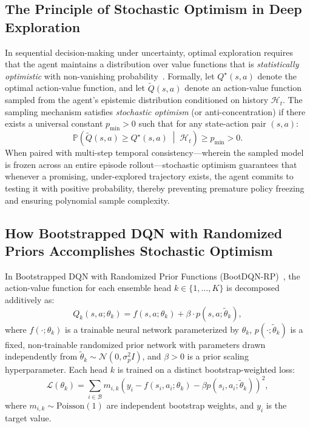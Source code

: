 \documentclass[10pt]{article}
\begin{document}
\subsection{The Principle of Stochastic Optimism in Deep Exploration}
In sequential decision-making under uncertainty, optimal exploration requires that the agent maintains a distribution over value functions that is \emph{statistically optimistic} with non-vanishing probability~\citep{osband2017posterior, osband2019deep}. Formally, let $Q^\star(s, a)$ denote the optimal action-value function, and let $\tilde{Q}(s, a)$ denote an action-value function sampled from the agent's epistemic distribution conditioned on history $\mathcal{H}_t$. The sampling mechanism satisfies \emph{stochastic optimism} (or anti-concentration) if there exists a universal constant $p_{\min} > 0$ such that for any state-action pair $(s, a)$:
\begin{equation}
\mathbb{P}\left(\tilde{Q}(s, a) \ge Q^\star(s, a) \;\middle|\; \mathcal{H}_t\right) \ge p_{\min} > 0.
\label{eq:stochastic_optimism_def}
\end{equation}
When paired with multi-step temporal consistency—wherein the sampled model is frozen across an entire episode rollout—stochastic optimism guarantees that whenever a promising, under-explored trajectory exists, the agent commits to testing it with positive probability, thereby preventing premature policy freezing and ensuring polynomial sample complexity.

\subsection{How Bootstrapped DQN with Randomized Priors Accomplishes Stochastic Optimism}
In Bootstrapped DQN with Randomized Prior Functions (BootDQN-RP)~\citep{osband2018randomized}, the action-value function for each ensemble head $k \in \{1, \dots, K\}$ is decomposed additively as:
\begin{equation}
Q_k(s, a; \theta_k) = f(s, a; \theta_k) + \beta \cdot p(s, a; \tilde{\theta}_k),
\label{eq:bootdqn_rp_decomp}
\end{equation}
where $f(\cdot; \theta_k)$ is a trainable neural network parameterized by $\theta_k$, $p(\cdot; \tilde{\theta}_k)$ is a fixed, non-trainable randomized prior network with parameters drawn independently from $\tilde{\theta}_k \sim \mathcal{N}(0, \sigma_p^2 I)$, and $\beta > 0$ is a prior scaling hyperparameter. Each head $k$ is trained on a distinct bootstrap-weighted loss:
\begin{equation}
\mathcal{L}(\theta_k) = \sum_{i \in \mathcal{B}} m_{i, k} \left( y_i - f(s_i, a_i; \theta_k) - \beta p(s_i, a_i; \tilde{\theta}_k) \right)^2,
\end{equation}
where $m_{i, k} \sim \text{Poisson}(1)$ are independent bootstrap weights, and $y_i$ is the target value.
\end{document}
